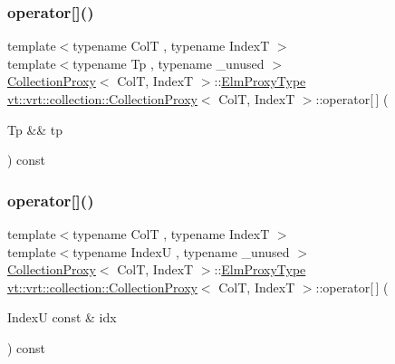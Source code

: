 \mbox{\label{structvt_1_1vrt_1_1collection_1_1_collection_proxy_aadaff277615aa5f7b051a6387e695e16}} 
\subsubsection{\texorpdfstring{operator[]()}{operator[]()}\hspace{0.1cm}{\footnotesize\ttfamily [1/2]}}
{\footnotesize\ttfamily template$<$typename ColT , typename IndexT $>$ \\
template$<$typename Tp , typename \+\_\+unused $>$ \\
\hyperlink{structvt_1_1vrt_1_1collection_1_1_collection_proxy}{Collection\+Proxy}$<$ ColT, IndexT $>$\+::\hyperlink{structvt_1_1vrt_1_1collection_1_1_collection_proxy_a892c21eae1dca37321d7973f72b55b0a}{Elm\+Proxy\+Type} \hyperlink{structvt_1_1vrt_1_1collection_1_1_collection_proxy}{vt\+::vrt\+::collection\+::\+Collection\+Proxy}$<$ ColT, IndexT $>$\+::operator\mbox{[}$\,$\mbox{]} (\begin{DoxyParamCaption}\item[{Tp \&\&}]{tp }\end{DoxyParamCaption}) const}

\mbox{\label{structvt_1_1vrt_1_1collection_1_1_collection_proxy_a81f027fb0c7d2b55ec06a2f91dd8d72e}} 
\subsubsection{\texorpdfstring{operator[]()}{operator[]()}\hspace{0.1cm}{\footnotesize\ttfamily [2/2]}}
{\footnotesize\ttfamily template$<$typename ColT , typename IndexT $>$ \\
template$<$typename IndexU , typename \+\_\+unused $>$ \\
\hyperlink{structvt_1_1vrt_1_1collection_1_1_collection_proxy}{Collection\+Proxy}$<$ ColT, IndexT $>$\+::\hyperlink{structvt_1_1vrt_1_1collection_1_1_collection_proxy_a892c21eae1dca37321d7973f72b55b0a}{Elm\+Proxy\+Type} \hyperlink{structvt_1_1vrt_1_1collection_1_1_collection_proxy}{vt\+::vrt\+::collection\+::\+Collection\+Proxy}$<$ ColT, IndexT $>$\+::operator\mbox{[}$\,$\mbox{]} (\begin{DoxyParamCaption}\item[{IndexU const \&}]{idx }\end{DoxyParamCaption}) const}



